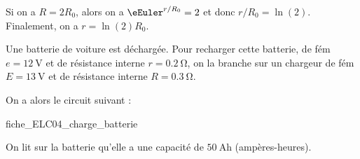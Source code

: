 \begin{corrige}
Si on a $R = 2R_0$, alors on a $\eEuler^{r/R_0} =2$ et donc $r/R_0 = \ln(2)$. Finalement, on a 
$r = \ln(2) R_0$.
\end{corrige}



\finEntrainement






\newpage




\hauteurLargeurCadreReponse		{8mm}{4cm}
\typeEntrainement				{} %
\initialisationEntrainement


Une batterie de voiture est déchargée. 
Pour recharger cette batterie, de fém $e=\SI{12}{\volt}$ et de résistance interne $r=\SI{0,2}{\ohm}$, on la branche sur un chargeur de fém $E=\SI{13}{\volt}$ et de résistance interne $R=\SI{0,3}{\ohm}$. 

On a alors le circuit suivant : 


\begin{center}
{fiche_ELC04_charge_batterie}
\end{center}

On lit sur la batterie qu'elle a une capacité de $\SI{50}{\ampere \hour}$ (ampères-heures). 

\bigskip



\debutEntrainement


